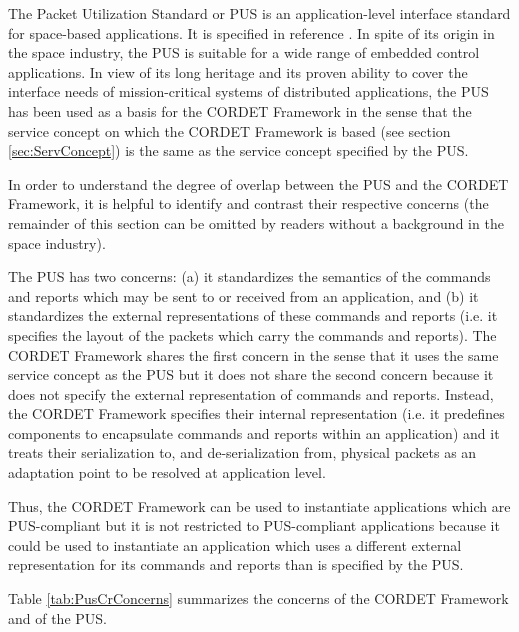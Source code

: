 The Packet Utilization Standard or PUS is an application-level interface standard for space-based applications. 
It is specified in reference \cite{ref:pus}. 
In spite of its origin in the space industry, the PUS is suitable for a wide range of embedded control applications. 
In view of its long heritage and its proven ability to cover the interface needs of mission-critical systems of distributed applications, the PUS  has been used as a basis for the CORDET Framework in the sense that the service concept on which the CORDET Framework is based (see section \ref{sec:ServConcept}) is the same as the service concept specified by the PUS. 

In order to understand the degree of overlap between the PUS and the CORDET Framework, it is helpful to identify and contrast their respective concerns (the remainder of this section can be omitted by readers without a background in the space industry).

The PUS has two concerns: (a) it standardizes the semantics of the commands and reports which may be sent to or received from an application, and (b) it standardizes the external representations of these commands and reports (i.e. it specifies the layout of the packets which carry the commands and reports). 
The CORDET Framework shares the first concern in the sense that it uses the same service concept as the PUS but it does not share the second concern because it does not specify the external representation of commands and reports. 
Instead, the CORDET Framework specifies their internal representation (i.e. it predefines components to encapsulate commands and reports within an application) and it treats their serialization to, and de-serialization from, physical packets as an adaptation point to be resolved at application level.  
 
Thus, the CORDET Framework can be used to instantiate applications which are PUS-compliant but it is not restricted to PUS-compliant applications because it could be used to instantiate an application which uses a different external representation for its commands and reports than is specified by the PUS.

Table \ref{tab:PusCrConcerns} summarizes the concerns of the CORDET Framework and of the PUS.

